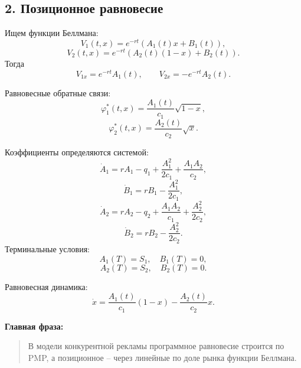 \documentclass[12pt,a4paper]{article}
\begin{document}
\subsection*{2. Позиционное равновесие}

Ищем функции Беллмана:
\[
 V_1(t,x)=e^{-rt}(A_1(t)x+B_1(t)),
\]
\[
 V_2(t,x)=e^{-rt}(A_2(t)(1-x)+B_2(t)).
\]
Тогда
\[
 V_{1x}=e^{-rt}A_1(t),\qquad V_{2x}=-e^{-rt}A_2(t).
\]

Равновесные обратные связи:
\[
 \varphi_1^*(t,x)=\frac{A_1(t)}{c_1}\sqrt{1-x},
\]
\[
 \varphi_2^*(t,x)=\frac{A_2(t)}{c_2}\sqrt{x}.
\]

Коэффициенты определяются системой:
\[
 \dot A_1=rA_1-q_1+\frac{A_1^2}{2c_1}+\frac{A_1A_2}{c_2},
\]
\[
 \dot B_1=rB_1-\frac{A_1^2}{2c_1},
\]
\[
 \dot A_2=rA_2-q_2+\frac{A_1A_2}{c_1}+\frac{A_2^2}{2c_2},
\]
\[
 \dot B_2=rB_2-\frac{A_2^2}{2c_2}.
\]
Терминальные условия:
\[
 A_1(T)=S_1,\quad B_1(T)=0,
\]
\[
 A_2(T)=S_2,\quad B_2(T)=0.
\]

Равновесная динамика:
\[
 \dot x=\frac{A_1(t)}{c_1}(1-x)-\frac{A_2(t)}{c_2}x.
\]

\textbf{Главная фраза:}
\begin{quote}
В модели конкурентной рекламы программное равновесие строится по PMP, а позиционное -- через линейные по доле рынка функции Беллмана.
\end{quote}
\end{document}
